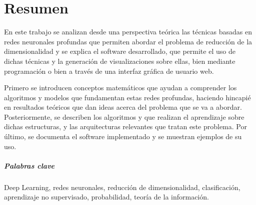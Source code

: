 
\chapter*{Resumen}

En este trabajo se analizan desde una perspectiva teórica las técnicas basadas en redes neuronales profundas que permiten abordar el problema de reducción de la dimensionalidad y se explica el software desarrollado, que permite el uso de dichas técnicas y la generación de visualizaciones sobre ellas, bien mediante programación o bien a través de una interfaz gráfica de usuario web.

Primero se introducen conceptos matemáticos que ayudan a comprender los algoritmos y modelos que fundamentan estas redes profundas, haciendo hincapié en resultados teóricos que dan ideas acerca del problema que se va a abordar. Posteriormente, se describen los algoritmos y que realizan el aprendizaje sobre dichas estructuras, y las arquitecturas relevantes que tratan este problema. Por último, se documenta el software implementado y se muestran ejemplos de su uso.

\paragraph{Palabras clave} Deep Learning, redes neuronales, reducción de dimensionalidad, clasificación, aprendizaje no supervisado, probabilidad, teoría de la información.


